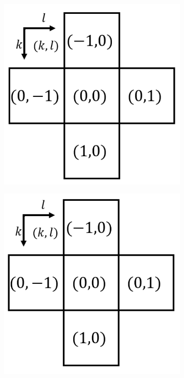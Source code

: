 \begin{figure}[H]
    \centering
    \begin{subfigure}[t]{.4\textwidth}
    \includegraphics[width=0.9\linewidth]{images/result/cross.png}
    \centering
    \caption{}
    \end{subfigure}
    \begin{subfigure}[t]{.4\textwidth}
    \includegraphics[width=0.9\linewidth]{images/result/square.png}
    \centering
    \caption{}
    \end{subfigure}
    \caption{}
\end{figure}

